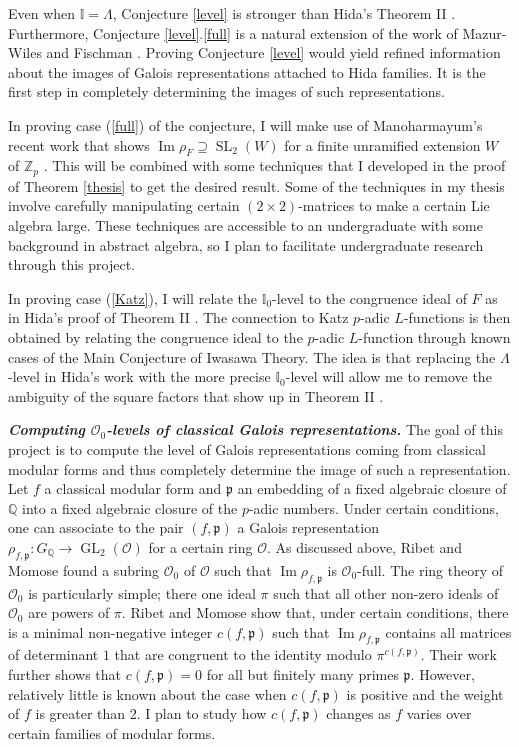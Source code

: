 \documentclass[12pt]{article}
\newcommand{\I}{\mathbb{I}}
\newcommand{\OK}{\ensuremath{\mathcal{O}}}
\newcommand{\p}{\mathfrak{p}}
\newcommand{\Q}{\mathbb{Q}}
\newcommand{\Z}{\mathbb{Z}}
\theoremstyle{definition}
\DeclareMathOperator{\GL}{GL}
\DeclareMathOperator{\im}{Im}
\DeclareMathOperator{\SL}{SL}
\begin{document}
Even when $\I = \Lambda$, Conjecture \ref{level} is stronger than Hida's Theorem II \cite{Hida15}.  Furthermore, Conjecture \ref{level}.\ref{full} is a natural extension of the work of  Mazur-Wiles \cite{MazurWiles86} and Fischman \cite{Fischman02}.  Proving Conjecture \ref{level} would yield refined information about the images of Galois representations attached to Hida families.  It is the first step in completely determining the images of such representations.  

In proving case (\ref{full}) of the conjecture, I will make use of Manoharmayum's recent work that shows $\im \rho_F \supseteq \SL_2(W)$ for a finite unramified extension $W$ of $\Z_p$ \cite{Manoharmayum15}.  This will be combined with some techniques that I developed in the proof of Theorem \ref{thesis} to get the desired result.  Some of the techniques in my thesis involve carefully manipulating certain $(2 \times 2)$-matrices to make a certain Lie algebra large.  These techniques are accessible to an undergraduate with some background in abstract algebra, so I plan to facilitate undergraduate research through this project. 

In proving case (\ref{Katz}), I will relate the $\I_0$-level to the congruence ideal of $F$ as in Hida's proof of Theorem II \cite{Hida15}.  The connection to Katz $p$-adic $L$-functions is then obtained by relating the congruence ideal to the $p$-adic $L$-function through known cases of the Main Conjecture of Iwasawa Theory.  The idea is that replacing the $\Lambda$-level in Hida's work with the more precise $\I_0$-level will allow me to remove the ambiguity of the square factors that show up in Theorem II \cite{Hida15}.

\textit{\textbf{Computing $\OK_0$-levels of classical Galois representations.}}  The goal of this project is to compute the level of Galois representations coming from classical modular forms and thus completely determine the image of such a representation.  Let $f$ a classical modular form and $\p$ an embedding of a fixed algebraic closure of $\Q$ into a fixed algebraic closure of the $p$-adic numbers.  Under certain conditions, one can associate to the pair $(f, \p)$ a Galois representation $\rho_{f, \p} : G_\Q \to \GL_2(\OK)$ for a certain ring $\OK$.  As discussed above, Ribet \cite{Ribet83} and Momose \cite{Momose81} found a subring $\OK_0$ of $\OK$ such that $\im \rho_{f, \p}$ is $\OK_0$-full.  The ring theory of $\OK_0$ is particularly simple; there one ideal $\pi$ such that all other non-zero ideals of $\OK_0$ are powers of $\pi$.  Ribet and Momose show that, under certain conditions, there is a minimal non-negative integer $c(f, \p)$ such that $\im \rho_{f, \p}$ contains all matrices of determinant $1$ that are congruent to the identity modulo $\pi^{c(f, \p)}$.  Their work further shows that $c(f, \p) = 0$ for all but finitely many primes $\p$.  However, relatively little is known about the case when $c(f, \p)$ is positive and the weight of $f$ is greater than $2$.  I plan to study how $c(f, \p)$ changes as $f$ varies over certain families of modular forms.
\end{document}

